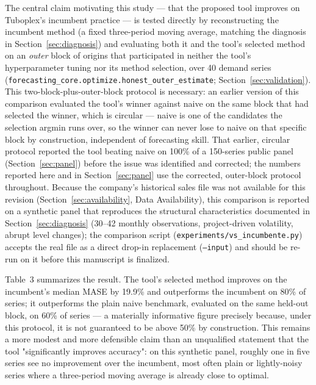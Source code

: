 \documentclass[forecasting,article,submit,pdftex,moreauthors]{Definitions/mdpi}
\begin{document}
The central claim motivating this study --- that the proposed tool improves on Tuboplex's incumbent practice --- is tested directly by reconstructing the incumbent method (a fixed three-period moving average, matching the diagnosis in Section~\ref{sec:diagnosis}) and evaluating both it and the tool's selected method on an \emph{outer} block of origins that participated in neither the tool's hyperparameter tuning nor its method selection, over 40 demand series (\texttt{forecasting\_core.optimize.honest\_outer\_estimate}; Section~\ref{sec:validation}). This two-block-plus-outer-block protocol is necessary: an earlier version of this comparison evaluated the tool's winner against naive on the same block that had selected the winner, which is circular --- naive is one of the candidates the selection argmin runs over, so the winner can never lose to naive on that specific block by construction, independent of forecasting skill. That earlier, circular protocol reported the tool beating naive on 100\% of a 150-series public panel (Section~\ref{sec:panel}) before the issue was identified and corrected; the numbers reported here and in Section~\ref{sec:panel} use the corrected, outer-block protocol throughout. Because the company's historical sales file was not available for this revision (Section~\ref{sec:availability}, Data Availability), this comparison is reported on a synthetic panel that reproduces the structural characteristics documented in Section~\ref{sec:diagnosis} (30--42 monthly observations, project-driven volatility, abrupt level changes); the comparison script (\texttt{experiments/vs\_incumbente.py}) accepts the real file as a direct drop-in replacement (\texttt{--input}) and should be re-run on it before this manuscript is finalized.

Table~3 summarizes the result. The tool's selected method improves on the incumbent's median MASE by 19.9\% and outperforms the incumbent on 80\% of series; it outperforms the plain naive benchmark, evaluated on the same held-out block, on 60\% of series --- a materially informative figure precisely because, under this protocol, it is not guaranteed to be above 50\% by construction. This remains a more modest and more defensible claim than an unqualified statement that the tool "significantly improves accuracy": on this synthetic panel, roughly one in five series see no improvement over the incumbent, most often plain or lightly-noisy series where a three-period moving average is already close to optimal.
\end{document}

